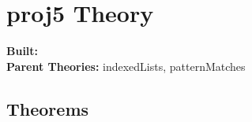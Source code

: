 \documentclass[11pt, twoside]{article}
\begin{document}


\tableofcontents
\cleardoublepage
\HOLpagestyle

\section{proj5 Theory}
\begin{flushleft}
\textbf{Built:} \HOLprojFiveDate \\[2pt]
\textbf{Parent Theories:} indexedLists, patternMatches
\end{flushleft}



\subsection{Theorems}

\HOLprojFiveTheorems

\HOLindex
\end{document}
